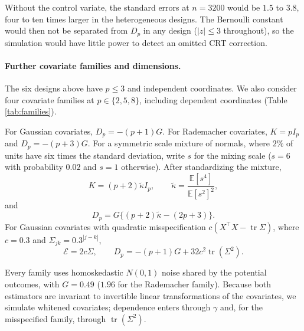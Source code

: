 \documentclass{article}
\newcommand{\EEE}{\mathbb{E}}
\DeclareMathOperator{\tr}{tr}
\theoremstyle{plain}
\theoremstyle{definition}
\theoremstyle{remark}
\begin{document}
Without the control variate, the standard errors at $n=3200$ would be
$1.5$ to $3.8$, four to ten times larger in the heterogeneous designs.
The Bernoulli constant would then not be separated from $D_p$ in any
design ($|z|\leq3$ throughout), so the simulation would have little
power to detect an omitted CRT correction.

\begin{table}[htbp]
\centering
\caption{Ablation: $z=(\hat D_p-D^{\mathrm{alt}})/\widehat{\mathrm{SE}}$ at $n=3200$ for each design and candidate constant. Values with $|z|>3$ indicate rejection of that candidate. Each ``drop'' column removes one block from $D_p$: the term $-3\mathcal R$, the term $-Q$, the residual terms $8\tr(\mathcal E^2)+8S^\top\EEE[Z\varepsilon^2]$ (``resid.''), or the three terms involving $\mathcal E_W$.}
\label{tab:ablation}
\small
\setlength{\tabcolsep}{4pt}
\end{table}

\paragraph{Further covariate families and dimensions.}
The six designs above have $p\le3$ and independent coordinates. We also consider four covariate families at $p\in\{2,5,8\}$, including dependent coordinates (Table \ref{tab:families}).

For Gaussian covariates,
$D_p=-(p+1)G$. For Rademacher covariates,
$K=pI_p$ and $D_p=-(p+3)G$. For a symmetric scale mixture of normals,
where $2\%$ of units have six times the standard deviation, write
$s$ for the mixing scale ($s=6$ with probability $0.02$ and
$s=1$ otherwise). After standardizing the mixture,
\[
K=(p+2)\tilde\kappa I_p,
\qquad
\tilde\kappa=\frac{\EEE[s^4]}{\EEE[s^2]^2},
\]
and
\[
D_p
=
G\{(p+2)\tilde\kappa-(2p+3)\}.
\]
For Gaussian covariates with quadratic misspecification
$c(X^\top X-\tr\Sigma)$, where $c=0.3$ and
$\Sigma_{jk}=0.3^{|j-k|}$,
\[
\mathcal E=2c\Sigma,
\qquad
D_p=-(p+1)G+32c^2\tr(\Sigma^2).
\]

Every family uses homoskedastic $N(0,1)$ noise shared by the potential
outcomes, with $G=0.49$ ($1.96$ for the Rademacher family). Because both estimators are invariant to invertible linear transformations of the covariates, we simulate whitened covariates; dependence enters through $\gamma$ and, for the misspecified family, through $\tr(\Sigma^2)$.
\end{document}
